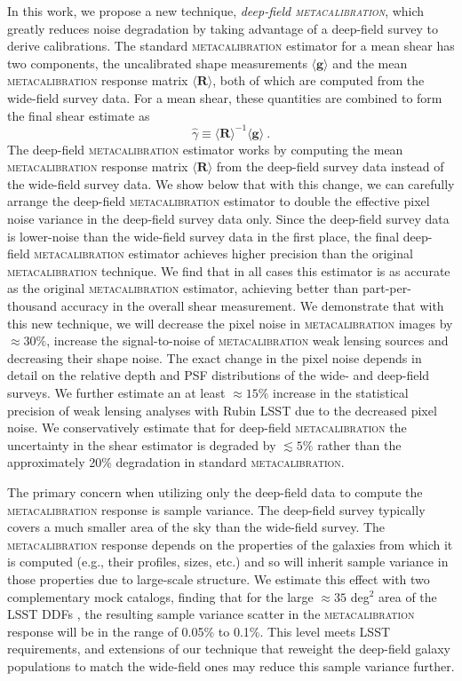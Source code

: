 \documentclass[twocolumn]{openjournal}
\makeatletter
\newcommand{\mcal}{\textsc{metacalibration}\@\xspace}
\makeatother
\begin{document}
In this work, we propose a new technique, \textit{deep-field \textsc{metacalibration}},
which greatly reduces noise degradation by taking advantage of a
deep-field survey to derive calibrations. The standard \mcal estimator for
a mean shear has two
components, the uncalibrated shape measurements $\langle \mathbf{g} \rangle$ and the
mean \mcal response matrix $\langle\mathbf{R}\rangle$, both of which are computed from
the wide-field survey data. For a mean shear, these quantities are combined to
form the final shear estimate as
\citep{HuffMcal2017,SheldonMcal2017}
\begin{equation*}
\hat\gamma \equiv \langle\mathbf{R}\rangle^{-1}\langle \mathbf{g} \rangle\ .
\end{equation*}
The deep-field \mcal estimator works by computing the mean \mcal response matrix
$\langle\mathbf{R}\rangle$ from the deep-field survey data instead of the wide-field
survey data. We show below that with this change, we can carefully arrange the
deep-field \mcal estimator to double the effective pixel noise variance in the
deep-field survey data only. Since the deep-field survey data is lower-noise than the
wide-field survey data in the first place, the final deep-field \mcal estimator achieves
higher precision than the original \mcal technique. We find that in all cases this
estimator is as accurate as the original \mcal estimator, achieving better than
part-per-thousand accuracy in the overall shear measurement. We demonstrate that with
this new technique, we will decrease the pixel noise in \mcal images by $\approx30\%$,
increase the signal-to-noise of \mcal weak lensing sources and decreasing their shape noise.
The exact change in the pixel noise depends in detail on the relative depth and PSF
distributions of the wide- and deep-field surveys. We further estimate an at least
$\approx15\%$ increase in the statistical precision of weak lensing analyses with
Rubin LSST due to the decreased pixel noise. We conservatively estimate that for
deep-field \mcal the uncertainty in the shear estimator is degraded by $\lesssim5\%$
rather than the approximately 20\% degradation in standard \mcal.

The primary concern when utilizing only the deep-field data to compute the \mcal
response is sample variance. The deep-field survey typically covers a much smaller
area of the sky than the wide-field survey. The \mcal response depends on the properties
of the galaxies from which it is computed (e.g., their profiles, sizes, etc.) and so
will inherit sample variance in those properties due to large-scale structure. We
estimate this effect with two complementary mock catalogs, finding that for the large
$\approx35$ deg$^2$ area of the LSST DDFs \citep{lsst-ddf-design,ivezic2019lsst}, the
resulting sample variance scatter in the \mcal response will be in the range of 0.05\%
to 0.1\%. This level meets LSST requirements, and extensions of our technique that
reweight the deep-field galaxy populations to match the wide-field ones may reduce this
sample variance further.
\end{document}
